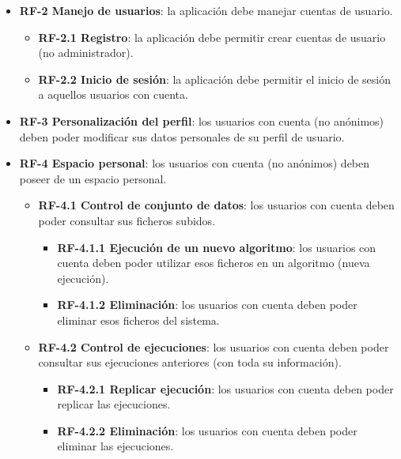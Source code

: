 \begin{itemize}
    \item \textbf{RF-2 Manejo de usuarios}: la aplicación debe manejar cuentas
    de usuario.
    \begin{itemize}
        \item \textbf{RF-2.1 Registro}: la aplicación debe permitir crear
        cuentas de usuario (no administrador).
        \item \textbf{RF-2.2 Inicio de sesión}: la aplicación debe permitir el
        inicio de sesión a aquellos usuarios con cuenta.
    \end{itemize}
    \item \textbf{RF-3 Personalización del perfil}: los usuarios con cuenta (no
    anónimos) deben poder modificar sus datos personales de su perfil de
    usuario.

    \item \textbf{RF-4 Espacio personal}: los usuarios con cuenta (no anónimos)
    deben poseer de un espacio personal.
    \begin{itemize}
        \item \textbf{RF-4.1 Control de conjunto de datos}: los usuarios con
        cuenta deben poder consultar sus ficheros subidos.
        \begin{itemize}
            \item \textbf{RF-4.1.1 Ejecución de un nuevo algoritmo}: los
            usuarios con cuenta deben poder utilizar esos ficheros en un
            algoritmo (nueva ejecución).
            
            \item \textbf{RF-4.1.2 Eliminación}: los usuarios con cuenta deben
            poder eliminar esos ficheros del sistema.
        \end{itemize}
        \item \textbf{RF-4.2 Control de ejecuciones}:  los usuarios con cuenta
        deben poder consultar sus ejecuciones anteriores (con toda su
        información).
        \begin{itemize}
            \item \textbf{RF-4.2.1 Replicar ejecución}: los usuarios con cuenta
            deben poder replicar las ejecuciones.
            \item \textbf{RF-4.2.2 Eliminación}: los usuarios con cuenta deben
            poder eliminar las ejecuciones.
        \end{itemize}
    \end{itemize}


\end{itemize}
